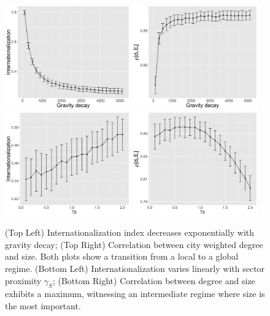 \documentclass[11pt]{article}
\begin{document}
\begin{figure}
	\includegraphics[width=0.48\textwidth,height=0.25\textheight]{figures/internationalization-gravityDecay_errorbars.png}
    \includegraphics[width=0.48\textwidth,height=0.25\textheight]{figures/rhoDegreeSize-gravityDecay_errorbars.png}\\
    \includegraphics[width=0.48\textwidth,height=0.25\textheight]{figures/internationalization-gammaSectors_errorbars.png}
    \includegraphics[width=0.48\textwidth,height=0.25\textheight]{figures/rhoDegreeSize-gammaSectors_errorbars.png}
    \caption{(Top Left) Internationalization index decreases exponentially with gravity decay; (Top Right) Correlation between city weighted degree and size. Both plots show a transition from a local to a global regime. (Bottom Left) Internationalization varies linearly with sector proximity $\gamma_S$; (Bottom Right) Correlation between degree and size exhibits a maximum, witnessing an intermediate regime where size is the most important. \label{fig:onefactor}}
\end{figure}
\end{document}
